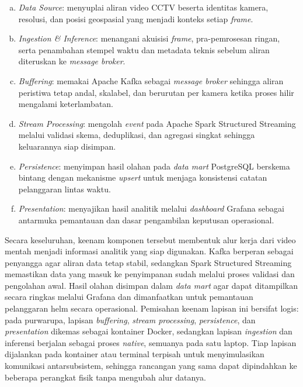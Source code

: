 \begin{enumerate}[a.]
  \item \textit{Data Source}: menyuplai aliran video CCTV beserta identitas kamera, resolusi, dan posisi geospasial yang menjadi konteks setiap \textit{frame}.

  \item \textit{Ingestion \& Inference}: menangani akuisisi \textit{frame}, pra-pemrosesan ringan, serta penambahan stempel waktu dan metadata teknis sebelum aliran diteruskan ke \textit{message broker}.

  \item \textit{Buffering}: memakai Apache Kafka sebagai \textit{message broker} sehingga aliran peristiwa tetap andal, skalabel, dan berurutan per kamera ketika proses hilir mengalami keterlambatan.

  \item \textit{Stream Processing}: mengolah \textit{event} pada Apache Spark Structured Streaming melalui validasi skema, deduplikasi, dan agregasi singkat sehingga keluarannya siap disimpan.

  \item \textit{Persistence}: menyimpan hasil olahan pada \textit{data mart} PostgreSQL berskema bintang dengan mekanisme \textit{upsert} untuk menjaga konsistensi catatan pelanggaran lintas waktu.

  \item \textit{Presentation}: menyajikan hasil analitik melalui \textit{dashboard} Grafana sebagai antarmuka pemantauan dan dasar pengambilan keputusan operasional.
\end{enumerate}

Secara keseluruhan, keenam komponen tersebut membentuk alur kerja dari video mentah menjadi informasi analitik yang siap digunakan. Kafka berperan sebagai penyangga agar aliran data tetap stabil, sedangkan Spark Structured Streaming memastikan data yang masuk ke penyimpanan sudah melalui proses validasi dan pengolahan awal. Hasil olahan disimpan dalam \textit{data mart} agar dapat ditampilkan secara ringkas melalui Grafana dan dimanfaatkan untuk pemantauan pelanggaran helm secara operasional. Pemisahan keenam lapisan ini bersifat logis: pada purwarupa, lapisan \textit{buffering}, \textit{stream processing}, \textit{persistence}, dan \textit{presentation} dikemas sebagai kontainer Docker, sedangkan lapisan \textit{ingestion} dan inferensi berjalan sebagai proses \textit{native}, semuanya pada satu laptop. Tiap lapisan dijalankan pada kontainer atau terminal terpisah untuk menyimulasikan komunikasi antarsubsistem, sehingga rancangan yang sama dapat dipindahkan ke beberapa perangkat fisik tanpa mengubah alur datanya.


